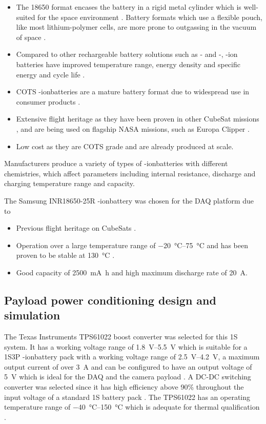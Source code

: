 \documentclass{report}
\newcommand{\liion}{\ce{Li}-ion}
\begin{document}
\begin{itemize}
  \item The 18650 format encases the battery in a rigid metal cylinder which is well-suited for the space environment \cite{knap2020review}. Battery formats which use a flexible pouch, like most lithium-polymer cells, are more prone to outgassing in the vacuum of space \cite{knap2020review}.
  \item Compared to other rechargeable battery solutions such as - and -, -ion batteries have improved temperature range, energy density and specific energy and cycle life \cite{pathak2023review}.
  \item COTS \liion batteries are a mature battery format due to widespread use in consumer products \cite{pathak2023review}.
  \item Extensive flight heritage as they have been proven in other CubeSat missions \cite{knap2020review}, and are being used on flagship NASA missions, such as Europa Clipper \cite{krause2021performance}.
  \item Low cost as they are COTS grade and are already produced at scale. %
\end{itemize}

Manufacturers produce a variety of types of \liion batteries with different chemistries, which affect parameters including internal resistance, discharge and charging temperature range and capacity.

The Samsung INR18650-25R \liion battery was chosen for the DAQ platform due to
\begin{itemize}
  \item Previous flight heritage on CubeSats \cite{marcelino2021orbit}.
  \item Operation over a large temperature range of \SIrange{-20}{75}{\degreeCelsius} and has been proven to be stable at \SI{130}{\degreeCelsius} \cite{samsung2014}.
  \item Good capacity of \SI{2500}{\milli\ampere\hour} and high maximum discharge rate of \SI{20}{\ampere}.
\end{itemize}

\subsection{Payload power conditioning design and simulation}

The Texas Instruments TPS61022 boost converter was selected for this 1S system. It has a working voltage range of \SIrange{1.8}{5.5}{\volt} which is suitable for a 1S3P \liion battery pack with a working voltage range of \SIrange{2.5}{4.2}{\volt}, a maximum output current of over \SI{3}{\ampere} and can be configured to have an output voltage of \SI{5}{\volt} which is ideal for the DAQ and the camera payload \cite{ti2021tps61022}. A DC-DC switching converter was selected since it has high efficiency above 90\% throughout the input voltage of a standard 1S battery pack \cite{ti2021tps61022}. The TPS61022 has an operating temperature range of \SIrange{-40}{150}{\degreeCelsius} which is adequate for thermal qualification \cite{ti2021tps61022}. %
\end{document}
